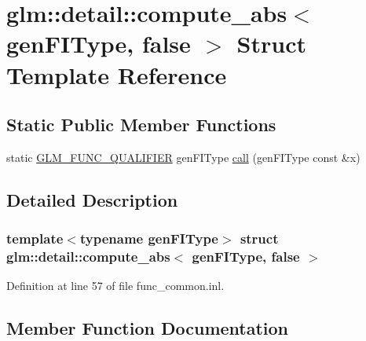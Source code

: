 \hypertarget{structglm_1_1detail_1_1compute__abs_3_01gen_f_i_type_00_01false_01_4}{}\section{glm\+:\+:detail\+:\+:compute\+\_\+abs$<$ gen\+F\+I\+Type, false $>$ Struct Template Reference}
\label{structglm_1_1detail_1_1compute__abs_3_01gen_f_i_type_00_01false_01_4}
\subsection*{Static Public Member Functions}
\begin{DoxyCompactItemize}
\item 
static \hyperlink{setup_8hpp_a33fdea6f91c5f834105f7415e2a64407}{G\+L\+M\+\_\+\+F\+U\+N\+C\+\_\+\+Q\+U\+A\+L\+I\+F\+I\+ER} gen\+F\+I\+Type \hyperlink{structglm_1_1detail_1_1compute__abs_3_01gen_f_i_type_00_01false_01_4_a0758b7608495285101dea21f0a7cc37a}{call} (gen\+F\+I\+Type const \&x)
\end{DoxyCompactItemize}


\subsection{Detailed Description}
\subsubsection*{template$<$typename gen\+F\+I\+Type$>$\newline
struct glm\+::detail\+::compute\+\_\+abs$<$ gen\+F\+I\+Type, false $>$}



Definition at line 57 of file func\+\_\+common.\+inl.



\subsection{Member Function Documentation}
\mbox{\label{structglm_1_1detail_1_1compute__abs_3_01gen_f_i_type_00_01false_01_4_a0758b7608495285101dea21f0a7cc37a}} 
